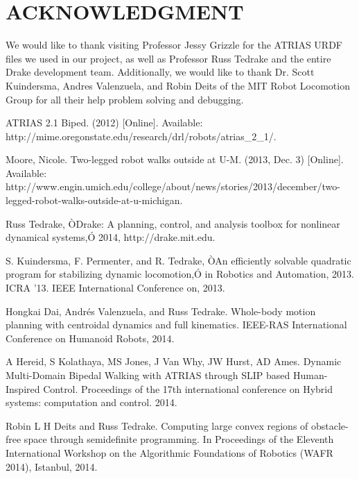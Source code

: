 \documentclass[letterpaper, 10 pt, conference]{ieeeconf}  %
\begin{document}







\section*{ACKNOWLEDGMENT}

We would like to thank visiting Professor Jessy Grizzle for the ATRIAS URDF files we used in our project, as well as Professor Russ Tedrake and the entire Drake development team. Additionally, we would like to thank Dr. Scott Kuindersma, Andres Valenzuela, and Robin Deits of the MIT Robot Locomotion Group for all their help problem solving and debugging.




\begin{thebibliography}{99}

 ATRIAS 2.1 Biped. (2012) [Online]. Available: http://mime.oregonstate.edu/research/drl/robots/atrias\_2\_1/. 

 Moore, Nicole. Two-legged robot walks outside at U-M. (2013, Dec. 3) [Online]. Available: http://www.engin.umich.edu/college/about/news/stories/2013/december/two-legged-robot-walks-outside-at-u-michigan. 

 Russ Tedrake, ÒDrake: A planning, control, and analysis toolbox for nonlinear dynamical systems,Ó  2014, http://drake.mit.edu.

 S. Kuindersma, F. Permenter, and R. Tedrake, ÒAn efficiently solvable quadratic program for stabilizing dynamic locomotion,Ó in Robotics and Automation, 2013. ICRA ’13. IEEE International Conference on, 2013.

 Hongkai Dai, Andrés Valenzuela, and Russ Tedrake. Whole-body motion planning with centroidal dynamics and full kinematics. IEEE-RAS International Conference on Humanoid Robots, 2014. 

 A Hereid, S Kolathaya, MS Jones, J Van Why, JW Hurst, AD Ames. Dynamic Multi-Domain Bipedal Walking with ATRIAS through SLIP based Human-Inspired Control. Proceedings of the 17th international conference on Hybrid systems: computation and control. 2014.

 Robin L H Deits and Russ Tedrake. Computing large convex regions of obstacle-free space through semidefinite programming. In Proceedings of the Eleventh International Workshop on the Algorithmic Foundations of Robotics (WAFR 2014), Istanbul, 2014.

\end{thebibliography}

% 
% 
\end{document}
